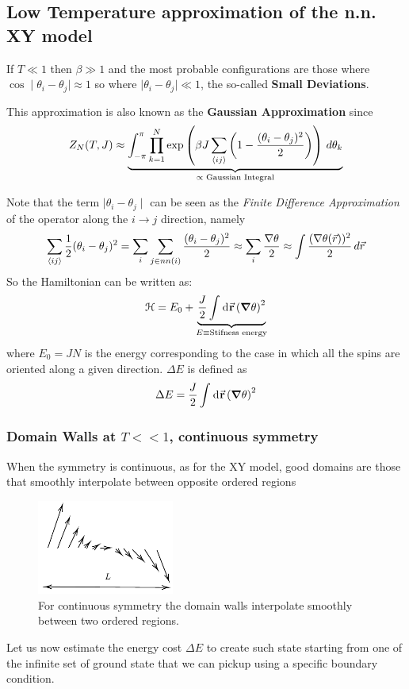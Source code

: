 \documentclass[../../Main/Main.tex]{subfiles}
\begin{document}
\subsection{Low Temperature approximation of the n.n. XY model}

If $T \ll 1$ then $\beta \gg 1$ and the most probable configurations are those where $\cos \mid \theta_{i} - \theta_{j}\mid \approx 1$ so where $\mid \theta_{i} - \theta_{j}\mid \ll 1$, the so-called \textbf{Small Deviations}.

This approximation is also known as the \textbf{Gaussian Approximation} since 
$$Z_{N}(T,J) \approx \underbrace{ \int _{-\pi}^{\pi} \prod_{k=1}^{N}\exp\left( \beta J \sum_{{\left< ij \right>} }\left( 1 - \frac{(\theta_{i} - \theta_{j})^{2}}{2} \right) \right) \, d\theta_{k} }_{ \propto \text{ Gaussian Integral} } $$

Note that the term $\mid \theta_{i} - \theta_{j}\mid$ can be seen as the \textit{Finite Difference Approximation} of the operator along the $i \to j$ direction, namely
$$\sum_{{\left< ij \right>} } \frac{1}{2}(\theta_{i} - \theta_{j})^{2} = \sum_{i} \sum_{j \in nn(i)} \frac{(\theta_{i} - \theta_{j})^{2}}{2} \approx \sum_{i} \frac{\nabla \theta}{2} \approx \int \frac{(\nabla \theta(\vec{r}))^{2}}{2} \, d\vec{r} $$
So the Hamiltonian can be written as:
\begin{equation}
  \mathcal{H} = E_0 + \underbrace{\frac{J}{2} \int_{}^{} \dd[]{\va{r}} \qty(\grad \theta )^2 }_{E \equiv \text{Stifness energy}}
\end{equation}
where \( E_0 = JN \) is the energy corresponding to the case in which all the spins are oriented along a given direction. $\Delta E$ is defined as
  \begin{equation}
    \Delta E = \frac{J}{2} \int_{}^{} \dd[]{\va{r}} \qty(\grad \theta )^2
  \end{equation}

\subsubsection{Domain Walls at $T << 1$, continuous symmetry}

When the symmetry is continuous, as for the XY model, good domains are those that smoothly interpolate between opposite ordered regions
\begin{figure}[h!]
\centering
\includegraphics[width=0.4\textwidth]{./img/3.pdf}
\caption{\label{fig:10_3} For continuous symmetry the domain walls interpolate smoothly between two ordered regions.}
\end{figure}
Let us now estimate the energy cost $\Delta E$ to create such state starting from one of the infinite set of ground state that we can pickup using a specific boundary condition.
\end{document}

